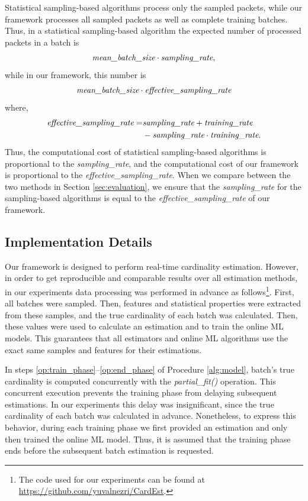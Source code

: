		Statistical sampling-based algorithms process only the sampled packets, while our framework processes all sampled packets as well as complete training batches. Thus, in a statistical sampling-based algorithm the expected number of  processed packets in a batch is 
		\begin{align*}
		\emph{mean\_batch\_size} \cdot \emph{sampling\_rate},
		\end{align*}
		while in our framework, this number is
		\begin{align*}
		\emph{mean\_batch\_size} \cdot \emph{effective\_sampling\_rate}
		\end{align*}
		where,
		\begin{align*}
		\emph{effective\_sampling\_rate}=& \emph{sampling\_rate}+\emph{training\_rate}\\&
		-\emph{sampling\_rate} \cdot \emph{training\_rate}.
		\end{align*}
		Thus, the computational cost of statistical sampling-based algorithms is proportional to the \emph{sampling\_rate}, and the computational cost of our framework is proportional to the \emph{effective\_sampling\_rate}. When we compare between the two methods in Section \ref{sec:evaluation}, we ensure that the \emph{sampling\_rate} for the sampling-based algorithms is equal to the \emph{effective\_sampling\_rate} of our framework.
	
	\subsection{Implementation Details}

			Our framework is designed to perform real-time cardinality estimation. However, in order to get reproducible and comparable results over all estimation methods, in our experiments data processing was performed in advance as follows\footnote{The code used for our experiments can be found at \url{https://github.com/yuvalnezri/CardEst}.}. First, all batches were sampled. Then, features and statistical properties were extracted from these samples, and the true cardinality of each batch was calculated. Then, these values were used to calculate an estimation and to train the online ML models. This guarantees that all estimators and online ML algorithms use the exact same samples and features for their estimations.
			
			In steps \ref{op:train_phase}--\ref{op:end_phase} of Procedure \ref{alg:model}, batch's true cardinality is computed concurrently with the \emph{partial\_fit()} operation. This concurrent execution prevents the training phase from delaying subsequent estimations. In our experiments this delay was insignificant, since the true cardinality of each batch was calculated in advance. Nonetheless, to express this behavior, during each training phase we first provided an estimation and only then trained the online ML model. Thus, it is assumed that the training phase ends before the subsequent batch estimation is requested.
			
